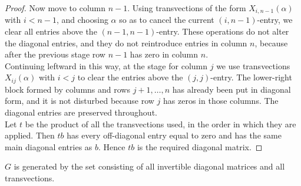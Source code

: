 \documentclass[../Odyssey_Project.tex]{subfiles}
\begin{document}
\begin{proof}
Now move to column $n-1$. Using transvections of the form $X_{i,n-1}(\alpha)$ with $i<n-1$, and choosing $\alpha$ so as to cancel the current $(i,n-1)$-entry, we clear all entries above the $(n-1,n-1)$-entry. These operations do not alter the diagonal entries, and they do not reintroduce entries in column $n$, because after the previous stage row $n-1$ has zero in column $n$.\\
Continuing leftward in this way, at the stage for column $j$ we use transvections $X_{ij}(\alpha)$ with $i<j$ to clear the entries above the $(j,j)$-entry. The lower-right block formed by columns and rows $j+1,\ldots,n$ has already been put in diagonal form, and it is not disturbed because row $j$ has zeros in those columns. The diagonal entries are preserved throughout.\\
Let $t$ be the product of all the transvections used, in the order in which they are applied. Then $tb$ has every off-diagonal entry equal to zero and has the same main diagonal entries as $b$. Hence $tb$ is the required diagonal matrix.
\end{proof}

\begin{theorem}
\label{thm:4.12}
$G$ is generated by the set consisting of all invertible diagonal matrices and all transvections.
\end{theorem}
\end{document}
